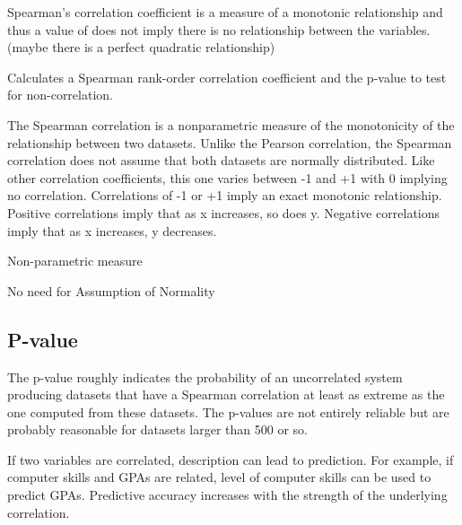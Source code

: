 Spearman’s correlation coefficient is a measure of a monotonic relationship and thus a value of does not imply there is no relationship between the variables. (maybe there is a perfect quadratic relationship)

Calculates a Spearman rank-order correlation coefficient and the p-value to test for non-correlation.

The Spearman correlation is a nonparametric measure of the monotonicity of the relationship between two datasets. Unlike the Pearson correlation, the Spearman correlation does not assume that both datasets are normally distributed. Like other correlation coefficients, this one varies between -1 and +1 with 0 implying no correlation. Correlations of -1 or +1 imply an exact monotonic relationship. Positive correlations imply that as x increases, so does y. Negative correlations imply that as x increases, y decreases.

Non-parametric measure

No need for Assumption of Normality

\subsection{P-value}

The p-value roughly indicates the probability of an uncorrelated system producing datasets that have a Spearman correlation at least as extreme as the one computed from these datasets. The p-values are not entirely reliable but are probably reasonable for datasets larger than 500 or so.

If two variables are correlated, description can lead to prediction. For example, if computer skills and GPAs are related, level of computer skills can be used to predict GPAs. Predictive accuracy increases with the strength of the underlying correlation.


%
%


